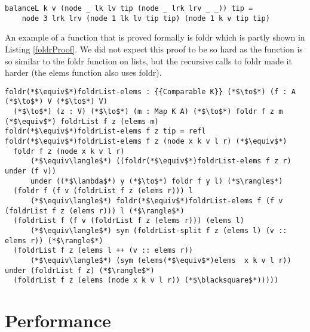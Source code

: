 \documentclass[a4paper,UKenglish,cleveref, autoref, thm-restate]{template/lipics-v2021}
\begin{document}
\begin{lstlisting}[label=balanceL,caption=balanceL assumes that the size of a node is 3 when the right branch is a tip.]
balanceL k v (node _ lk lv tip (node _ lrk lrv _ _)) tip = 
    node 3 lrk lrv (node 1 lk lv tip tip) (node 1 k v tip tip)
\end{lstlisting}

An example of a function that is proved formally is foldr which is partly shown in Listing \ref{foldrProof}. We did not expect this proof to be so hard as the function is so similar to the foldr function on lists, but the recursive calls to foldr made it harder (the elems function also uses foldr).

\begin{lstlisting}[label=foldrProof,caption=The following equality is proved foldr f z $\equiv$ foldr f z . elems]    
foldr(*$\equiv$*)foldrList-elems : {{Comparable K}} (*$\to$*) (f : A (*$\to$*) V (*$\to$*) V) 
  (*$\to$*) (z : V) (*$\to$*) (m : Map K A) (*$\to$*) foldr f z m (*$\equiv$*) foldrList f z (elems m)
foldr(*$\equiv$*)foldrList-elems f z tip = refl
foldr(*$\equiv$*)foldrList-elems f z (node x k v l r) (*$\equiv$*) 
  foldr f z (node x k v l r) 
      (*$\equiv\langle$*) ((foldr(*$\equiv$*)foldrList-elems f z r) under (f v)) 
      under ((*$\lambda$*) y (*$\to$*) foldr f y l) (*$\rangle$*)
  (foldr f (f v (foldrList f z (elems r))) l 
      (*$\equiv\langle$*) foldr(*$\equiv$*)foldrList-elems f (f v (foldrList f z (elems r))) l (*$\rangle$*)
  (foldrList f (f v (foldrList f z (elems r))) (elems l) 
      (*$\equiv\langle$*) sym (foldrList-split f z (elems l) (v :: elems r)) (*$\rangle$*)
  (foldrList f z (elems l ++ (v :: elems r)) 
      (*$\equiv\langle$*) (sym (elems(*$\equiv$*)elems  x k v l r)) under (foldrList f z) (*$\rangle$*)
  (foldrList f z (elems (node x k v l r)) (*$\blacksquare$*))))) 
\end{lstlisting}

\section*{Performance}


\end{document}
